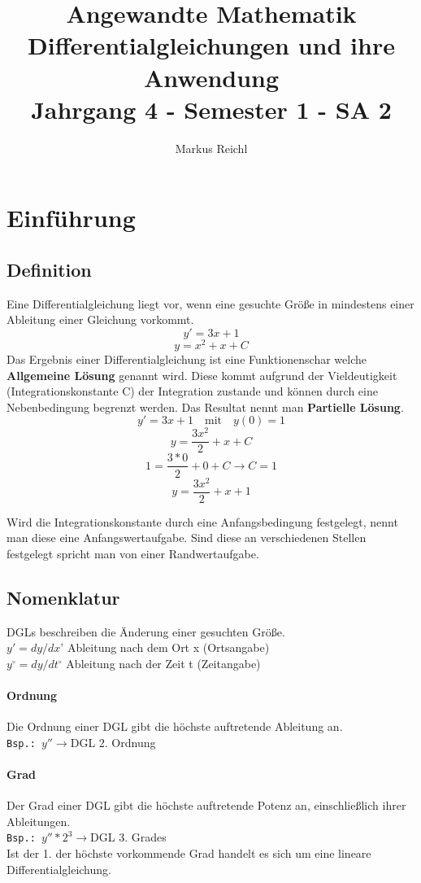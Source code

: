 \documentclass[a4paper,12pt]{article}
\title{Angewandte Mathematik\\	\large{Differentialgleichungen und ihre Anwendung}\bigskip\\	\small{Jahrgang 4 - Semester 1 - SA 2}}
\author{Markus Reichl}
\begin{document}
\maketitle

\tableofcontents

\newpage

\section{Einf\"uhrung}
\subsection{Definition}
Eine Differentialgleichung liegt vor, wenn eine gesuchte Gr\"o\ss{}e in mindestens einer Ableitung einer Gleichung vorkommt.
$$y'=3x+1$$
$$y=x^2+x+C$$
Das Ergebnis einer Differentialgleichung ist eine Funktionenschar welche \textbf{Allgemeine L\"osung} genannt wird. 
Diese kommt aufgrund der Vieldeutigkeit (Integrationskonstante C) der Integration zustande und k\"onnen durch eine Nebenbedingung begrenzt werden. Das Resultat nennt man \textbf{Partielle L\"osung}.
$$y'=3x+1 \quad \text{mit} \quad y(0)=1$$
$$y=\frac{3x^2}{2} + x + C$$
$$1=\frac{3*0}{2} + 0 + C \to C = 1$$
$$y=\frac{3x^2}{2}+x+1$$

Wird die Integrationskonstante durch eine Anfangsbedingung festgelegt,
nennt man diese eine Anfangswertaufgabe.
Sind diese an verschiedenen Stellen festgelegt spricht man von einer Randwertaufgabe.
\subsection{Nomenklatur}
DGLs beschreiben die Änderung einer gesuchten Größe.
\\
$y' = dy / dx$\quad' Ableitung nach dem Ort x (Ortsangabe)\\
$y^\circ = dy / dt$\quad$^\circ$ Ableitung nach der Zeit t (Zeitangabe)

\paragraph{Ordnung} Die Ordnung einer DGL gibt die höchste auftretende Ableitung an.\\
\texttt{Bsp.: $y'' \to$}\quad DGL 2. Ordnung
\paragraph{Grad} Der Grad einer DGL gibt die höchste auftretende Potenz an, einschließlich ihrer Ableitungen.\\
\texttt{Bsp.: $y'' * 2^3 \to$}\quad DGL 3. Grades\bigskip\\
Ist der 1. der h\"ochste vorkommende Grad handelt es sich um eine lineare Differentialgleichung.
\end{document}
